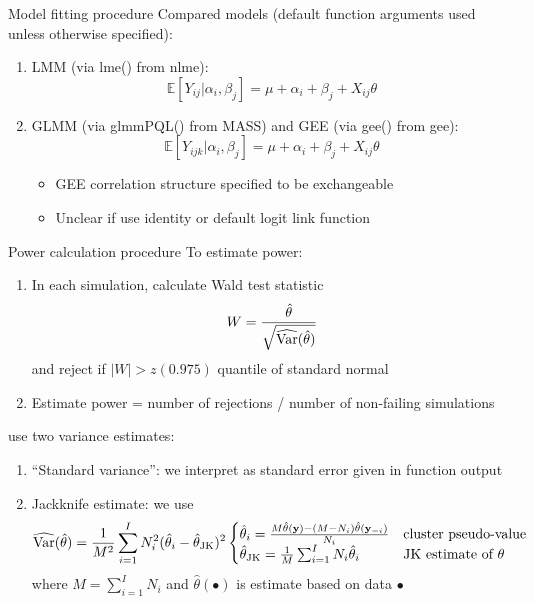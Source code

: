 \documentclass[9pt]{beamer}
\begin{document}
\begin{frame}{Model fitting procedure}
Compared models (default function arguments used unless otherwise specified):
\vspace{2em}
\begin{enumerate}
\setlength\itemsep{2em}

\item
LMM (via lme() from nlme):
\[
\mathbb{E}[Y_{ij}|\alpha_i,\beta_j] = \mu+\alpha_i+\beta_j+X_{ij}\theta
\]

\item
GLMM (via glmmPQL() from MASS) and GEE (via gee() from gee):
\[
\mathbb{E}[Y_{ijk}|\alpha_i,\beta_j] = \mu+\alpha_i+\beta_j+X_{ij}\theta
\]
\vspace{-1em}
\begin{itemize}
\item
GEE correlation structure specified to be exchangeable
\item
Unclear if \citeauthor{Hussey:2007} use identity or default logit link function
\end{itemize}

\end{enumerate}
\end{frame}



\begin{frame}{Power calculation procedure}
To estimate power:
\begin{enumerate}

\item
In each simulation, calculate Wald test statistic
\[
W=\frac{\hat{\theta}}{\sqrt{\widehat{\mathrm{Var}}(\hat{\theta})}}
\]
and reject if $|W| > z(0.975)$ quantile of standard normal

\item
Estimate power = number of rejections / number of non-failing simulations

\end{enumerate}
\vspace{2em}

\citet{Hussey:2007} use two variance estimates:
\begin{enumerate}

\item
``Standard variance'': we interpret as standard error given in function output

\item
Jackknife estimate: we use
\[
\widehat{\mathrm{Var}}(\hat{\theta}) = \frac{1}{M^2}\sum_{i=1}^IN_i^2(\hat{\theta}_i-\hat{\theta}_{\text{JK}})^2
\begin{cases}
\hat{\theta}_i = \frac{M\hat{\theta}(\mathbf{y}) - (M-N_i)\hat{\theta}(\mathbf{y}_{-i})}{N_i} & \text{cluster pseudo-value} \\
\hat{\theta}_{\text{JK}} = \frac{1}{M}\sum_{i=1}^I N_i\hat{\theta}_i & \text{JK estimate of $\theta$}
\end{cases}
\]
where $M=\sum_{i=1}^I N_i$ and $\hat{\theta}(\bullet)$ is estimate based on data $\bullet$
\end{enumerate}
\end{frame}
\end{document}
